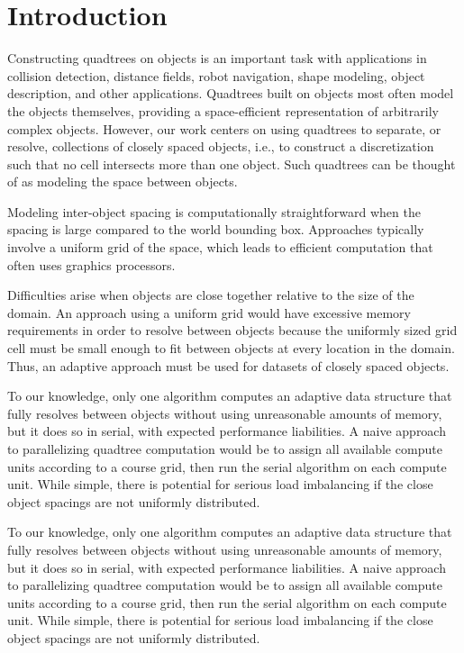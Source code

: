 \documentclass[final,3p,times,twocolumn]{elsarticle}
\begin{document}
\section{Introduction}
\label{sec:intro}
Constructing quadtrees on objects is an important task with applications in collision detection, distance fields, robot navigation, shape modeling, object description, and other applications. Quadtrees built on objects most often model the objects themselves, providing a space-efficient representation of arbitrarily complex objects. However, our work centers on using quadtrees to separate, or resolve, collections of closely spaced objects, i.e., to construct a discretization such that no cell intersects more than one object. Such quadtrees can be thought of as modeling the space between objects.

Modeling inter-object spacing is computationally straightforward when the spacing is large compared to the world bounding box. Approaches typically involve a uniform grid of the space, which leads to efficient computation that often uses graphics processors.

Difficulties arise when objects are close together relative to the size of the domain. An approach using a uniform grid would have excessive memory requirements in order to resolve between objects because the uniformly sized grid cell must be small enough to fit between objects at every location in the domain. Thus, an adaptive approach must be used for datasets of closely spaced objects.

To our knowledge, only one algorithm \cite{edwards2015approximating} computes an adaptive data structure that fully resolves between objects without using unreasonable amounts of memory, but it does so in serial, with expected performance liabilities. A naive approach to parallelizing quadtree computation would be to assign all available compute units according to a course grid, then run the serial algorithm on each compute unit. While simple, there is potential for serious load imbalancing if the close object spacings are not uniformly distributed.

To our knowledge, only one algorithm \cite{edwards2015approximating} computes an adaptive data structure that fully resolves between objects without using unreasonable amounts of memory, but it does so in serial, with expected performance liabilities. A naive approach to parallelizing quadtree computation would be to assign all available compute units according to a course grid, then run the serial algorithm on each compute unit. While simple, there is potential for serious load imbalancing if the close object spacings are not uniformly distributed.
\end{document}
